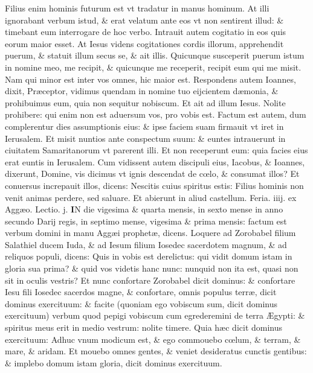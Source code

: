 \documentclass[a5paper,10pt]{book}
\def\rightmarginnote{%
	\lrmarginnote{\hskip\columnwidth \hskip -1em}}
\def\ae{æ}
\def\AE{Æ}
\def\oe{œ}
\begin{document}
\begin{multicols*}{2}
Filius enim hominis futurum est vt tradatur in manus hominum.
At illi ignorabant verbum istud, \& erat velatum ante eos vt non sentirent illud: \& timebant eum interrogare de hoc verbo.
Intrauit autem cogitatio in eos quis eorum maior esset.
At Iesus videns cogitationes cordis illorum, apprehendit puerum, \& statuit illum secus se, \& ait illis.
Quicunque susceperit puerum istum in nomine meo, me recipit, \& quicunque me receperit, recipit eum qui me misit.
Nam qui minor est inter vos omnes, hic maior est.
Respondens autem Ioannes, dixit, Pr\ae ceptor, vidimus quendam in nomine tuo eijcientem d\ae monia, \& prohibuimus eum, quia non sequitur nobiscum.
Et ait ad illum Iesus. Nolite prohibere: qui enim non est aduersum vos, pro vobis est.
Factum est autem, dum complerentur dies assumptionis eius: \& ipse faciem suam firmauit vt iret in Ierusalem.
Et misit nuntios ante conspectum suum: \& euntes intrauerunt in ciuitatem Samaritanorum vt parerent illi.
Et non receperunt eum: quia facies eius erat euntis in Ierusalem.
Cum vidissent autem discipuli eius, Iacobus, \& Ioannes, dixerunt, Domine, vis dicimus vt ignis descendat de c\oe lo, \& consumat illos?
Et conuersus increpauit
illos, dicens: Nescitis cuius spiritus estis: Filius hominis non venit animas perdere, sed saluare.
Et abierunt in aliud castellum.
\newline {} \color{red} \hypertarget{WED-QVARTA-ADV}{Feria. iiij.} ex Agg\ae o. \hfill Lectio. j. \color{black}
\vspace{-.25em}
\lettrine[lines=2]{\bfseries I}{}N\rightmarginnote{ca. 2.} die vigesima \& quarta mensis, in sexto mense in anno secundo Darij regis, in septimo mense, vigesima \& prima mensis: factum est verbum domini in manu Agg\ae i prophet\ae , dicens.
Loquere ad Zorobabel filium Salathiel ducem Iuda, \& ad Iesum filium Iosedec sacerdotem magnum, \& ad reliquos populi, dicens: Quis in vobis est derelictus: qui vidit domum istam in gloria sua prima? \& quid vos videtis hanc nunc: nunquid non ita est, quasi non sit in oculis vestris?
Et nunc confortare Zorobabel dicit dominus: \& confortare Iesu fili Iosedec sacerdos magne, \& confortare, omnis populus terr\ae , dicit dominus exercituum: \& facite (quoniam ego vobiscum sum, dicit dominus exercituum) verbum quod pepigi vobiscum cum egrederemini de terra \AE gypti: \& spiritus meus erit in medio vestrum: nolite timere.
Quia h\ae c dicit dominus exercituum: Adhuc vnum modicum est, \& ego commouebo c\oe lum, \& terram, \& mare, \& aridam.
Et mouebo omnes gentes, \& veniet desideratus cunctis gentibus: \& implebo domum istam gloria, dicit dominus exercituum.

\end{multicols*}
\end{document}
